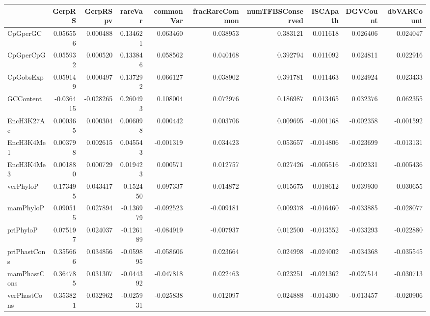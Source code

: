 \begin{tabular}{lrrrrrrrrr}
\toprule
{} &    GerpRS &  GerpRSpv &   rareVar &  commonVar &  fracRareCommon &  numTFBSConserved &  ISCApath &  DGVCount &  dbVARCount \\
\midrule
CpGperGC            &  0.056556 &  0.000488 &  0.134621 &   0.063460 &        0.038953 &          0.383121 &  0.011618 &  0.026406 &    0.024047 \\
CpGperCpG           &  0.055932 &  0.000520 &  0.133846 &   0.058562 &        0.040168 &          0.392794 &  0.011092 &  0.024811 &    0.022916 \\
CpGobsExp           &  0.059149 &  0.000497 &  0.137292 &   0.066127 &        0.038902 &          0.391781 &  0.011463 &  0.024924 &    0.023433 \\
GCContent           & -0.036415 & -0.028265 &  0.260493 &   0.108004 &        0.072976 &          0.186987 &  0.013465 &  0.032376 &    0.062355 \\
EncH3K27Ac          &  0.000365 &  0.000304 &  0.006098 &   0.000442 &        0.003706 &          0.009695 & -0.001168 & -0.002358 &   -0.001592 \\
EncH3K4Me1          &  0.003798 &  0.002615 &  0.045543 &  -0.001319 &        0.034423 &          0.053657 & -0.014806 & -0.023699 &   -0.013131 \\
EncH3K4Me3          &  0.001880 &  0.000729 &  0.019423 &   0.000571 &        0.012757 &          0.027426 & -0.005516 & -0.002331 &   -0.005436 \\
verPhyloP           &  0.173495 &  0.043417 & -0.152450 &  -0.097337 &       -0.014872 &          0.015675 & -0.018612 & -0.039930 &   -0.030655 \\
mamPhyloP           &  0.090515 &  0.027894 & -0.136979 &  -0.092523 &       -0.009181 &          0.009378 & -0.016460 & -0.033885 &   -0.028077 \\
priPhyloP           &  0.075197 &  0.024037 & -0.126189 &  -0.084919 &       -0.007937 &          0.012500 & -0.013552 & -0.033293 &   -0.022880 \\
priPhastCons        &  0.355666 &  0.034856 & -0.059895 &  -0.058606 &        0.023664 &          0.024998 & -0.024002 & -0.034368 &   -0.035545 \\
mamPhastCons        &  0.364785 &  0.031307 & -0.044392 &  -0.047818 &        0.022463 &          0.023251 & -0.021362 & -0.027514 &   -0.030713 \\
verPhastCons        &  0.353821 &  0.032962 & -0.025931 &  -0.025838 &        0.012097 &          0.024888 & -0.014300 & -0.013457 &   -0.020906 \\

\end{tabular}
